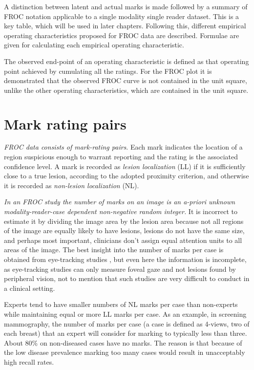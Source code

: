 \documentclass[
]{book}
\begin{document}
A distinction between latent and actual marks is made followed by a summary of FROC notation applicable to a single modality single reader dataset. This is a key table, which will be used in later chapters. Following this, different empirical operating characteristics proposed for FROC data are described. Formulae are given for calculating each empirical operating characteristic.

The observed end-point of an operating characteristic is defined as that operating point achieved by cumulating all the ratings. For the FROC plot it is demonstrated that the observed FROC curve is not contained in the unit square, unlike the other operating characteristics, which are contained in the unit square.

\hypertarget{froc-empirical-mark-rating-pairs}{%
\section{Mark rating pairs}\label{froc-empirical-mark-rating-pairs}}

\emph{FROC data consists of mark-rating pairs}. Each mark indicates the location of a region suspicious enough to warrant reporting and the rating is the associated confidence level. A mark is recorded as \emph{lesion localization} (LL) if it is sufficiently close to a true lesion, according to the adopted proximity criterion, and otherwise it is recorded as \emph{non-lesion localization} (NL).

\emph{In an FROC study the number of marks on an image is an a-priori unknown modality-reader-case dependent non-negative random integer.} It is incorrect to estimate it by dividing the image area by the lesion area because not all regions of the image are equally likely to have lesions, lesions do not have the same size, and perhaps most important, clinicians don't assign equal attention units to all areas of the image. The best insight into the number of marks per case is obtained from eye-tracking studies \citep{RN1490}, but even here the information is incomplete, as eye-tracking studies can only measure foveal gaze and not lesions found by peripheral vision, not to mention that such studies are very difficult to conduct in a clinical setting.

Experts tend to have smaller numbers of NL marks per case than non-experts while maintaining equal or more LL marks per case. As an example, in screening mammography, the number of marks per case (a case is defined as 4-views, two of each breast) that an expert will consider for marking to typically less than three. About 80\% on non-diseased cases have no marks. The reason is that because of the low disease prevalence marking too many cases would result in unacceptably high recall rates.
\end{document}
